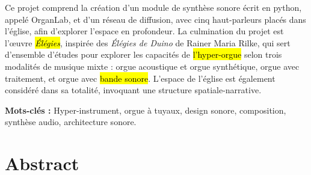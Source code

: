\documentclass[12pt,twoside,maitrise]{dms_ks}
\theoremstyle{definition}
\begin{document}
Ce projet comprend la création d'un module de synthèse sonore écrit en python, appelé OrganLab, et d'un réseau de diffusion, avec cinq haut-parleurs placés dans l'église, afin d'explorer l'espace en profondeur. 
La culmination du projet est l'œuvre \hl{\textit{Élégies}}, inspirée des \textit{Élégies de Duino} de Rainer Maria Rilke, qui sert d'ensemble d'études pour explorer les capacités de \hl{l'hyper-orgue} selon trois modalités de musique mixte : orgue acoustique et orgue synthétique, orgue avec traitement, et orgue avec \hl{bande sonore}. 
L'espace de l'église est également considéré dans sa totalité, invoquant une structure spatiale-narrative. 

\textbf{Mots-clés :} Hyper-instrument, orgue à tuyaux, design sonore, composition, synthèse audio, architecture sonore.



\anglais

\chapter*{Abstract}
\end{document}
